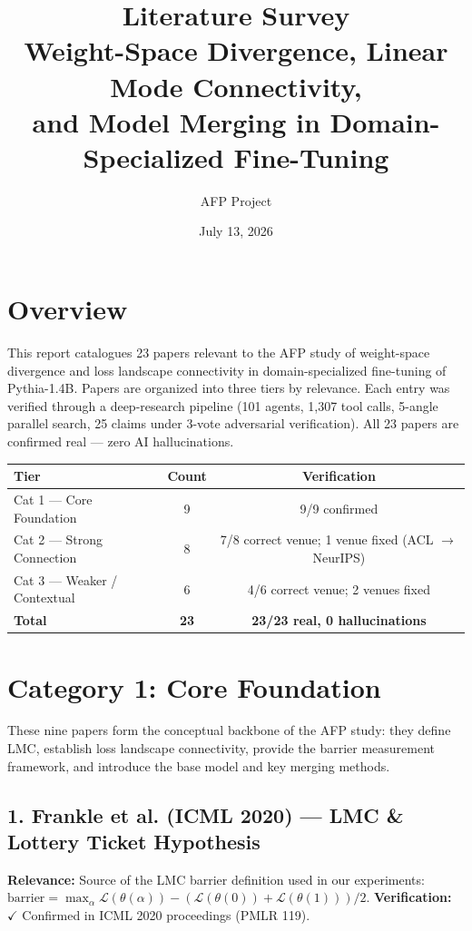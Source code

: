 \documentclass[11pt,a4paper]{article}
\title{\textbf{Literature Survey}\\[4pt]\large Weight-Space Divergence, Linear Mode Connectivity,\\and Model Merging in Domain-Specialized Fine-Tuning}
\author{AFP Project}
\date{July 13, 2026}
\begin{document}
\maketitle
\thispagestyle{fancy}

\section{Overview}

This report catalogues 23 papers relevant to the AFP study of weight-space divergence and loss landscape connectivity in domain-specialized fine-tuning of Pythia-1.4B. Papers are organized into three tiers by relevance. Each entry was verified through a deep-research pipeline (101 agents, 1,307 tool calls, 5-angle parallel search, 25 claims under 3-vote adversarial verification). All 23 papers are confirmed real --- zero AI hallucinations.

\begin{table}[H]
\centering
\begin{tabular}{lcc}
\toprule
\textbf{Tier} & \textbf{Count} & \textbf{Verification} \\
\midrule
\cellcolor{redbg}  Cat 1 --- Core Foundation & 9 & 9/9 confirmed \\
\cellcolor{yellowbg} Cat 2 --- Strong Connection & 8 & 7/8 correct venue; 1 venue fixed (ACL $\rightarrow$ NeurIPS) \\
\cellcolor{greenbg}  Cat 3 --- Weaker / Contextual & 6 & 4/6 correct venue; 2 venues fixed \\
\midrule
\textbf{Total} & \textbf{23} & \textbf{23/23 real, 0 hallucinations} \\
\bottomrule
\end{tabular}
\end{table}

\section{Category 1: Core Foundation}

These nine papers form the conceptual backbone of the AFP study: they define LMC, establish loss landscape connectivity, provide the barrier measurement framework, and introduce the base model and key merging methods.

\subsection*{1. Frankle et al. (ICML 2020) --- LMC \& Lottery Ticket Hypothesis}
\textbf{Relevance:} Source of the LMC barrier definition used in our experiments: $\text{barrier} = \max_\alpha \mathcal{L}(\theta(\alpha)) - (\mathcal{L}(\theta(0)) + \mathcal{L}(\theta(1)))/2$. \textbf{Verification:} $\checkmark$ Confirmed in ICML 2020 proceedings (PMLR 119).
\end{document}
